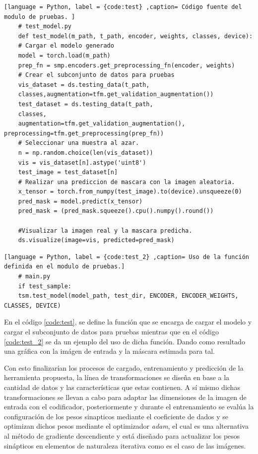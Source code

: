 \begin{lstlisting}[language = Python, label = {code:test} ,caption= Código fuente del modulo de pruebas. ]
    # test_model.py
    def test_model(m_path, t_path, encoder, weights, classes, device):
    # Cargar el modelo generado
    model = torch.load(m_path)
    prep_fn = smp.encoders.get_preprocessing_fn(encoder, weights)
    # Crear el subconjunto de datos para pruebas
    vis_dataset = ds.testing_data(t_path,
    classes,augmentation=tfm.get_validation_augmentation())
    test_dataset = ds.testing_data(t_path,
    classes, 
    augmentation=tfm.get_validation_augmentation(), preprocessing=tfm.get_preprocessing(prep_fn))
    # Seleccionar una muestra al azar.
    n = np.random.choice(len(vis_dataset))
    vis = vis_dataset[n].astype('uint8')
    test_image = test_dataset[n]
    # Realizar una prediccion de mascara con la imagen aleatoria.
    x_tensor = torch.from_numpy(test_image).to(device).unsqueeze(0)
    pred_mask = model.predict(x_tensor)
    pred_mask = (pred_mask.squeeze().cpu().numpy().round())

    #Visualizar la imagen real y la mascara predicha.
    ds.visualize(image=vis, predicted=pred_mask)
\end{lstlisting}

\begin{lstlisting}[language = Python, label = {code:test_2} ,caption= Uso de la función definida en el modulo de pruebas.]
    # main.py
    if test_sample:
    tsm.test_model(model_path, test_dir, ENCODER, ENCODER_WEIGHTS, CLASSES, DEVICE)
\end{lstlisting}

En el código \ref{code:test}, se define la función que se encarga de cargar el modelo y cargar el subconjunto de datos para pruebas mientras que en el código \ref{code:test_2} se da un ejemplo del uso de dicha función. Dando como resultado una gráfica con la imágen de entrada y la máscara estimada para tal.

Con esto finalizarían los procesos de cargado, entrenamiento y predicción de la herramienta propuesta, la línea de transformaciones se diseña en base a la cantidad de datos y las características que estas contienen. A sí mismo dichas transformaciones se llevan a cabo para adaptar las dimensiones de la imagen de entrada con el codificador, posteriormente y durante el entrenamiento se evalúa la configuración de los pesos sinapticos mediante el coeficiente de dados y se optimizan dichos pesos mediante el optimizador \emph{adam}, el cual es una alternativa al método de gradiente descendiente y está diseñado para actualizar los pesos sinápticos en elementos de naturaleza iterativa como es el caso de las imágenes. 



